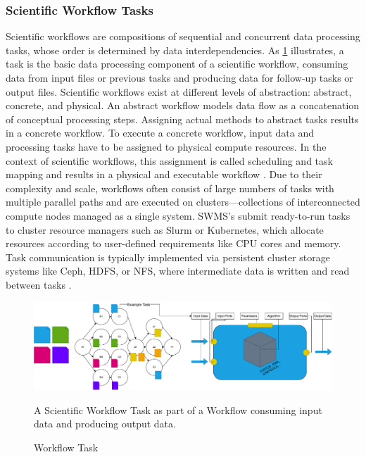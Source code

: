 \subsubsection{Scientific Workflow Tasks}
\label{sec:background_workflows_examples}
Scientific workflows are compositions of sequential and concurrent data processing tasks, whose order is determined by data interdependencies. As \ref{fig:02-workflow-task} illustrates, a task is the basic data processing component of a scientific workflow, consuming data from input files or previous tasks and producing data for follow-up tasks or output files. Scientific workflows exist at different levels of abstraction: abstract, concrete, and physical. An abstract workflow models data flow as a concatenation of conceptual processing steps. Assigning actual methods to abstract tasks results in a concrete workflow. To execute a concrete workflow, input data and processing tasks have to be assigned to physical compute resources. In the context of scientific workflows, this assignment is called scheduling and task mapping and results in a physical and executable workflow \cite{Bux2013} \cite{Witzke2024}.
Due to their complexity and scale, workflows often consist of large numbers of tasks with multiple parallel paths and are executed on clusters—collections of interconnected compute nodes managed as a single system. SWMS's submit ready-to-run tasks to cluster resource managers such as Slurm or Kubernetes, which allocate resources according to user-defined requirements like CPU cores and memory. Task communication is typically implemented via persistent cluster storage systems like Ceph, HDFS, or NFS, where intermediate data is written and read between tasks \cite{thamsen2025energyawareworkflowexecutionoverview}.

\begin{figure}[H]
    \centering
    \includegraphics[scale=0.4]{fig/02/02-workflow-task.pdf}
    \small
    \caption{Workflow Task}
    \label{fig:02-workflow-task}
    \tiny
    A Scientific Workflow Task as part of a Workflow consuming input data and producing output data.
\end{figure}

